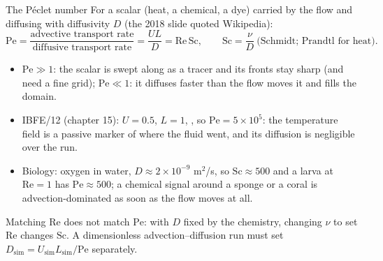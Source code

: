 \documentclass[aspectratio=169,11pt]{beamer}
\begin{document}
\begin{frame}{The P\'eclet number}
\label{fr:peclet}
\small For a scalar (heat, a chemical, a dye) carried by the flow and diffusing with diffusivity $D$ (the 2018 slide quoted Wikipedia):
\[
  \mathrm{Pe} = \frac{\text{advective transport rate}}{\text{diffusive transport rate}} = \frac{UL}{D} = \mathrm{Re}\,\mathrm{Sc}, \qquad \mathrm{Sc} = \frac{\nu}{D}\ \text{(Schmidt; Prandtl for heat)}.
\]
\begin{itemize}
  \item $\mathrm{Pe} \gg 1$: the scalar is swept along as a tracer and its fronts stay sharp (and need a fine grid); $\mathrm{Pe} \ll 1$: it diffuses faster than the flow moves it and fills the domain.
  \item IBFE/12 (chapter 15): $U = 0.5$, $L = 1$, , so $\mathrm{Pe} = 5\times10^5$: the temperature field is a passive marker of where the fluid went, and its diffusion is negligible over the run.
  \item Biology: oxygen in water, $D \approx 2\times10^{-9}$ m$^2$/s, so $\mathrm{Sc} \approx 500$ and a larva at $\mathrm{Re} = 1$ has $\mathrm{Pe} \approx 500$; a chemical signal around a sponge or a coral is advection-dominated as soon as the flow moves at all.
\end{itemize}
\vspace{1mm}
\begin{punchbox}
\small Matching $\mathrm{Re}$ does not match $\mathrm{Pe}$: with $D$ fixed by the chemistry, changing $\nu$ to set $\mathrm{Re}$ changes $\mathrm{Sc}$. A dimensionless advection--diffusion run must set $D_{\mathrm{sim}} = U_{\mathrm{sim}}L_{\mathrm{sim}}/\mathrm{Pe}$ separately.
\end{punchbox}
\end{frame}
\end{document}
